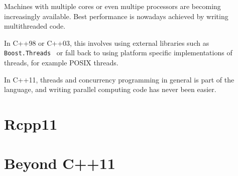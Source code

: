 Machines with multiple cores or even multipe 
processors are becoming increasingly available. Best performance 
is nowadays achieved by writing multithreaded code. 

In C++98 or C++03, this involves using external libraries 
such as \texttt{Boost.Threads}~\citep{KempfBoostThreads} 
or fall back to using platform specific 
implementations of threads, for example POSIX threads. 

In C++11, threads and concurrency programming in general is part of
the language, and writing parallel computing code has never been easier. 



\section{Rcpp11}

\section{Beyond C++11}



\address{Romain François\\
    R Enthusiasts\\
    1 place de l'égalité. 42400 Saint Chamond\\
    FRANCE }
    

